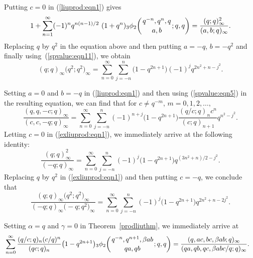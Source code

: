 \documentclass[10pt,a4paper]{amsart}
\numberwithin{equation}{section}
\begin{document}
Putting $c=0$ in (\ref{liuprod:eqn1}) gives
\begin{equation*}%
1+\sum_{n=1}^\infty (-1)^n q^{n(n-1)/2}~(1+q^n){_3 \phi_2} \biggl({{q^{-n}, q^n, q}
	\atop{ a, b}}; q, q\biggr)=\frac{(q; q)_\infty^2}{(a, b; q)_\infty}.
\end{equation*}
Replacing $q$ by $q^2$ in the equation above and then putting $a=-q$, $b=-q^2$ and finally using~(\ref{spvalue:eqn11}), we obtain \cite[equation~(1.7)]{Liu2002}
\begin{equation*}%
(q; q)_\infty \bigl(q^2; q^2\bigr)_\infty=\sum_{n=0}^\infty \sum_{j=-n}^n \bigl(1-q^{2n+1}\bigr)
(-1)^j q^{2n^2+n-j^2}.
\end{equation*}


Setting $a=0$ and $b=-q$ in (\ref{liuprod:eqn1}) and then using (\ref{spvalue:eqn5}) in the resulting equation, we can find that
 for $c\not=q^{-m}$, $m=0, 1, 2, \ldots,$
\begin{equation}\label{exliuprod:eqn1}
	\frac{(q, q, -c; q)_\infty}{(c, c, -q; q)_\infty}
	=\sum_{n=0}^\infty \sum_{j=-n}^n (-1)^{n+j} \bigl(1-q^{2n+1}\bigr)
	\frac{(q/c; q)_n c^n}{(c; q)_{n+1}} q^{n^2-j^2}.
\end{equation}
Letting $c=0$ in (\ref{exliuprod:eqn1}), we immediately arrive at the following identity:
\begin{equation*}%
	\frac{(q; q)^2_\infty}{(-q; q)_\infty}
	=\sum_{n=0}^\infty \sum_{j=-n}^n (-1)^j \bigl(1-q^{2n+1}\bigr) q^{(3n^2+n)/2-j^2}.
\end{equation*}
Replacing $q$ by $q^2$ in (\ref{exliuprod:eqn1}) and then putting $c=-q$, we conclude that
\begin{equation*}%
	\frac{(q; q)_\infty \bigl(q^2; q^2\bigr)_\infty}{(-q; q)_\infty \bigl(-q; q^2\bigr)_\infty}
	=\sum_{n=0}^\infty \sum_{j=-n}^n (-1)^j \bigl(1-q^{2n+1}\bigr)
	q^{2n^2+n-2j^2}.
\end{equation*}


Setting $\alpha=q$ and $\gamma=0$ in Theorem~\ref{prodliuthm}, we immediately arrive at
\begin{align} \label{liuprod:eqn15}
&\sum_{n=0}^\infty \frac{(q/c; q)_n (c/q)^n}{(qc; q)_n} \bigl(1-q^{2n+1}\bigr)
{_3\phi_2} \biggl({{q^{-n}, q^{n+1}, \beta ab}\atop{qa, qb}}; q, q\biggr)
=\frac{(q, ac, bc, \beta ab; q)_\infty}{(qa, qb, qc, \beta abc/q; q)_\infty}.
\end{align}
\end{document}

